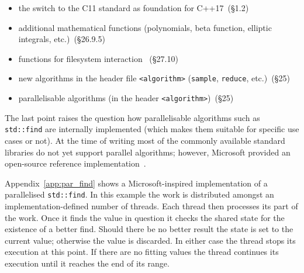 \begin{itemize}
\item the switch to the C11 standard as foundation for C++17~\cite{cpp17std}(§1.2)
\item additional mathematical functions (polynomials, beta function, elliptic integrals, etc.)~\cite{cpp17std}(§26.9.5)
\item functions for filesystem interaction ~\cite{cpp17std}(§27.10)
\item new algorithms in the header file \texttt{<algorithm>} (\texttt{sample}, \texttt{reduce}, etc.)~\cite{cpp17std}(§25)
\item parallelisable algorithms (in the header \texttt{<algorithm>})~\cite{cpp17std}(§25)
\end{itemize}

\noindent The last point raises the question how parallelisable algorithms such as \texttt{std::find} are internally implemented (which makes them suitable for specific use cases or not). At the time of writing most of the commonly available standard libraries do not yet support parallel algorithms; however, Microsoft provided an open-source reference implementation~\cite{parallel_stl}.

Appendix~\ref{app:par_find} shows a Microsoft-inspired implementation of a parallelised \texttt{std::find}. In this example the work is distributed amongst an implementation-defined number of threads. Each thread then processes its part of the work. Once it finds the value in question it checks the shared state for the existence of a better find. Should there be no better result the state is set to the current value; otherwise the value is discarded. In either case the thread stops its execution at this point. If there are no fitting values the thread continues its execution until it reaches the end of its range.